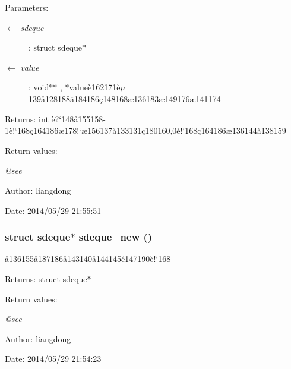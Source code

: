 \begin{Desc}
\item[Parameters:]
\begin{description}
\item[\mbox{$\leftarrow$} {\em sdeque}]: struct sdeque$\ast$ \item[\mbox{$\leftarrow$} {\em value}]: void$\ast$$\ast$ , $\ast$value\`{e}162171\`{e}$\mu$139\aa{}128188\"{a}184186\c{c}148168\ae{}136183\ae{}149176\ae{}141174 \end{description}
\end{Desc}
\begin{Desc}
\item[Returns:]int \`{e}?`148\aa{}155158-1\`{e}!`168\c{c}164186\ae{}178!`\ae{}156137\aa{}133131\c{c}180160,0\`{e}!`168\c{c}164186\ae{}136144\aa{}138159 \end{Desc}
\begin{Desc}
\item[Return values:]
\begin{description}
\item[{\em @see}]\end{description}
\end{Desc}
\begin{Desc}
\item[Author:]liangdong \end{Desc}
\begin{Desc}
\item[Date:]2014/05/29 21:55:51 \end{Desc}
\subsubsection{\setlength{\rightskip}{0pt plus 5cm}struct sdeque$\ast$ sdeque\_\-new ()}\label{sdeque_8c_a0}


\aa{}136155\aa{}187186\aa{}143140\aa{}144145\'{e}147190\`{e}!`168 

\begin{Desc}
\item[Returns:]struct sdeque$\ast$ \end{Desc}
\begin{Desc}
\item[Return values:]
\begin{description}
\item[{\em @see}]\end{description}
\end{Desc}
\begin{Desc}
\item[Author:]liangdong \end{Desc}
\begin{Desc}
\item[Date:]2014/05/29 21:54:23 \end{Desc}
